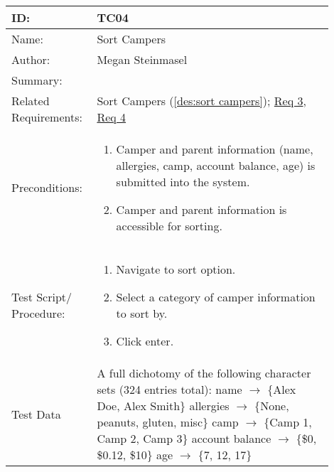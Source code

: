 \documentclass[11pt]{article}
\begin{document}
\begin{table}[H]
\begin{center}
\begin{tabular}{p{0.20\linewidth}p{0.70\linewidth}}
	ID: & TC04\\\hline
	Name: & Sort Campers \\\hline
	Author: & Megan Steinmasel\\\hline
	Summary: &  \\\hline
	Related \hspace{5em} Requirements:& Sort Campers (\cref{des:sort campers}); \hyperlink{Req3}{Req 3}, \hyperlink{Req4}{Req 4}\\\hline
	Preconditions:& \begin{enumerate}[topsep=0pt] 
		\item Camper and parent information (name, allergies, camp, account balance, age) is submitted into the system.
		\item Camper and parent information is accessible for sorting.
	\end{enumerate}\\\hline
	Test Script/ Procedure: & \begin{enumerate}[topsep=0pt]
	\item Navigate to sort option.
	\item Select a category of camper information to sort by.
	\item Click enter.
	\end{enumerate}\\\hline
	Test Data & \vspace*{.25em} A full dichotomy of the following character sets (324 entries total): \newline
	\hspace*{1cm} name $\rightarrow$ $\{$Alex Doe, Alex Smith$\}$	\newline
	\hspace*{1cm} allergies $\rightarrow$ $\{$None, peanuts, gluten, misc$\}$	\newline
	\hspace*{1cm} camp $\rightarrow$ $\{$Camp 1, Camp 2, Camp 3$\}$\newline
	\hspace*{1cm} account balance $\rightarrow$ $\{$\$0, \$0.12, \$10$\}$\newline
	\hspace*{1cm} age $\rightarrow$ $\{$7, 12, 17$\}$
\end{tabular}
\label{TC04}	
\end{center}
\end{table}
\end{document}
